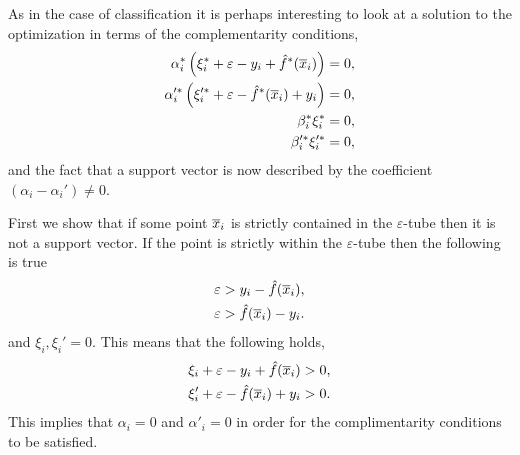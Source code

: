 \documentclass[a4paper,blends,pdf,colorBG,slideColor]{prosper}
\begin{document}
\es


As in the case of classification it is perhaps interesting to look at a solution to the optimization
in terms of the complementarity conditions,
\begin{align*}
\alpha_i^* \left(\xi_i^* + \varepsilon- y_i + \hat{f}^*(\overline{x}_i)\right) &= 0,\\
\alpha_i'^* \left(\xi_i'^* + \varepsilon - \hat{f}^*(\overline{x}_i)  + y_i \right) &= 0,\\
\beta_i^*\xi_i^* &= 0, \\
\beta_i'^*\xi_i'^* &= 0,
\end{align*}
and the fact that a support vector is now described by the coefficient $(\alpha_i - \alpha_i') \ne 0$.


\es


First we show that if some point $\overline{x}_i$ is strictly contained in the $\varepsilon$-tube then it is not a support vector.
If the point is strictly within the $\varepsilon$-tube then the following is true
\begin{align*}
\varepsilon &> y_i -  \hat{f}(\overline{x}_i) ,\\
\varepsilon &>  \hat{f}(\overline{x}_i)  - y_i . \\
\end{align*}
and $\xi_i,\xi_i' = 0$.
This means that the following holds,
\begin{align*}
\xi_i + \varepsilon- y_i + \hat{f}(\overline{x}_i)  &> 0,\\
\xi_i' + \varepsilon - \hat{f}(\overline{x}_i)  + y_i  &> 0. \\
\end{align*}
This implies that $\alpha_i=0$ and $\alpha'_i=0$ in order for the complimentarity conditions to be satisfied.
\end{document}

